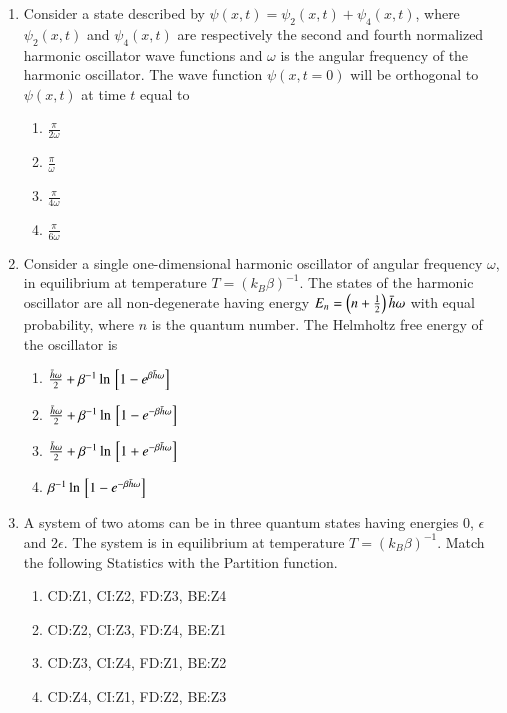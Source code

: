 \documentclass[journal]{IEEEtran}
\begin{document}
\begin{enumerate}
\item Consider a state described by $\psi(x,t)=\psi_2(x,t)+\psi_4(x,t)$, where $\psi_2(x,t)$ and $\psi_4(x,t)$ are respectively the second and fourth normalized harmonic oscillator wave functions and $\omega$ is the angular frequency of the harmonic oscillator. The wave function $\psi(x,t=0)$ will be orthogonal to $\psi(x,t)$ at time $t$ equal to

\begin{enumerate}
\item $\frac{\pi}{2\omega}$
\item $\frac{\pi}{\omega}$
\item $\frac{\pi}{4\omega}$
\item $\frac{\pi}{6\omega}$
\end{enumerate}

\item Consider a single one-dimensional harmonic oscillator of angular frequency $\omega$, in  equilibrium at temperature $T=(k_B\beta)^{-1}$. The states of the harmonic oscillator are all non-degenerate having energy $E_n=\left(n+\frac{1}{2}\right)\bar{h}\omega$ with equal probability, where $n$ is the quantum number. The Helmholtz free energy of the oscillator is

\begin{enumerate}
\item $\frac{\bar{h}\omega}{2}+\beta^{-1}\ln{\ensuremath{{}\left[1-e^{\beta\bar{h}\omega}\right]}}$
\item $\frac{\bar{h}\omega}{2}+\beta^{-1}\ln{\ensuremath{{}\left[1-e^{-\beta\bar{h}\omega}\right]}}$
\item $\frac{\bar{h}\omega}{2}+\beta^{-1}\ln{\ensuremath{{}\left[1+e^{-\beta\bar{h}\omega}\right]}}$
\item $\beta^{-1}\ln{\ensuremath{{}\left[1-e^{-\beta\bar{h}\omega}\right]}}$
\end{enumerate}

\item A system of two atoms can be in three quantum states having energies $0$, $\epsilon$ and $2\epsilon$. The system is in equilibrium at temperature $T=(k_B\beta)^{-1}$. Match the following Statistics with the Partition function.

\vspace{1 cm}

\begin{table}[h!]    
  \centering
  
\end{table} 

\begin{enumerate}
\item CD:Z1, CI:Z2, FD:Z3, BE:Z4
\item CD:Z2, CI:Z3, FD:Z4, BE:Z1
\item CD:Z3, CI:Z4, FD:Z1, BE:Z2
\item CD:Z4, CI:Z1, FD:Z2, BE:Z3
\end{enumerate}


\end{enumerate}
\end{document}
